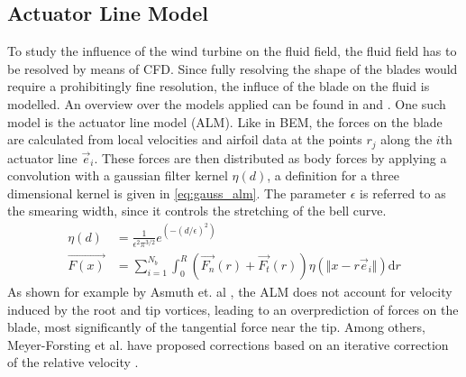 \subsection{Actuator Line Model}
To study the influence of the wind turbine on the fluid field, the fluid field has to be resolved by means of CFD. Since fully resolving the shape of the blades would require a prohibitingly fine resolution, the influce of the blade on the fluid is modelled. An overview over the models applied can be found in \cite{breton_survey_2017} and \cite{kheirabadi_quantitative_2019}. One such model is the actuator line model (ALM). Like in BEM, the forces on the blade are calculated from local velocities and airfoil data at the points $r_j$ along the $i$th actuator line $\vec{e}_i$. These forces are then distributed as body forces by applying a convolution with a gaussian filter kernel $\eta(d)$, a definition for a three dimensional kernel is given in \eqref{eq:gauss_alm}. The parameter $\epsilon$ is referred to as the smearing width, since it controls the stretching of the bell curve. \cite{sorensen_numerical_2002}
\begin{align}
	\eta(d) &= \frac{1}{\epsilon^2 \pi^{3/2}} e^{(-(d/\epsilon)^2)} \label{eq:gauss_alm} \\
	\vec{F(x)} &= \sum_{i=1}^{N_b} \int_{0}^{R} \left(\vec{F_n}(r)+ \vec{F_t}(r) \right) \eta(\Vert x - r\vec{e}_i\Vert) \mathrm{d}r \label{eq:ALM}
\end{align}
As shown for example by Asmuth et. al \cite{asmuth_actuator_2019-1}, the ALM does not account for velocity induced by the root and tip vortices, leading to an overprediction of forces on the blade, most significantly of the tangential force near the tip. Among others, Meyer-Forsting et al. have proposed corrections  based on an iterative correction of the relative velocity \cite{meyer_forsting_vortex-based_2019}.
